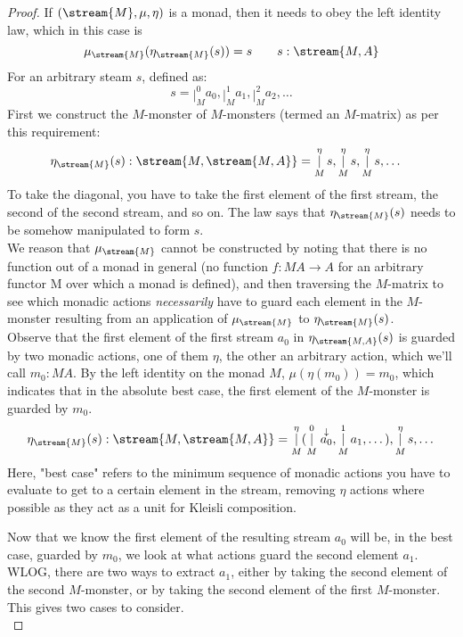 \begin{proof}
If $(\stream{M}, \mu, \eta)$ is a monad, then it needs to obey the left identity law, which in this case is
$$
\mu_{\stream{M}}(\eta_{\stream{M}}(s)) = s
\qquad s : \stream{M,A}
$$
For an arbitrary steam $s$, defined as:
$$
s = \mathop{|}_M^0 a_0, \mathop{|}_M^1 a_1, \mathop{|}_M^2  a_2, \dots
$$
First we construct the $M$-monster of $M$-monsters (termed an $M$-matrix) as per this requirement:
\begin{align*}
&\eta_{\stream{M}}(s) : \stream{M,\stream{M,A}} = \mathop{|}_M^\eta s, \mathop{|}_M^\eta s, \mathop{|}_M^\eta s, \dots
\end{align*}
To take the diagonal, you have to take the first element of the first stream, the second of the second stream, and so on. The law says that $\eta_{\stream{M}}(s)$ needs to be somehow manipulated to form $s$. \\

We reason that $\mu_{\stream{M}}$ cannot be constructed by noting that there is no function out of a monad in general (no function $f : MA \to A$ for an arbitrary functor M over which a monad is defined), and then traversing the $M$-matrix to see which monadic actions \emph{necessarily} have to guard each element in the $M$-monster resulting from an application of $\mu_{\stream{M}}$ to $\eta_{\stream{M}}(s)$.\\

Observe that the first element of the first stream $a_0$ in $\eta_{\stream{M,A}}(s)$ is guarded by two monadic actions, one of them $\eta$, the other an arbitrary action, which we'll call $m_0 : MA$. By the left identity on the monad $M$, $\mu(\eta(m_0)) = m_0$, which indicates that in the absolute best case, the first element of the $M$-monster is guarded by $m_0$.
$$
\eta_{\stream{M}}(s) : \stream{M,\stream{M,A}} = \mathop{|}_M^\eta (\mathop{|}_M^0 \stackrel{\downarrow}{a_0}, \mathop{|}_M^1 a_1, \dots), \mathop{|}_M^\eta s, \dots
$$
Here, "best case" refers to the minimum sequence of monadic actions you have to evaluate to get to a certain element in the stream, removing $\eta$ actions where possible as they act as a unit for Kleisli composition.

Now that we know the first element of the resulting stream $a_0$ will be, in the best case, guarded by $m_0$, we look at what actions guard the second element $a_1$. WLOG, there are two ways to extract $a_1$, either by taking the second element of the second $M$-monster, or by taking the second element of the first $M$-monster. This gives two cases to consider.\\


\end{proof}
